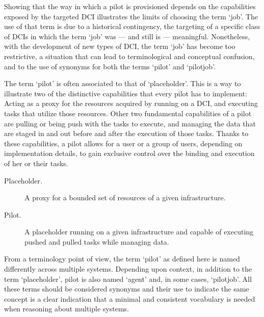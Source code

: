\documentclass{sig-alternate}
\begin{document}
Showing that the way in which a pilot is provisioned depends on the 
capabilities exposed by the targeted DCI illustrates the limits of choosing 
the term `job'. The use of that term is due to a historical contingency, the 
targeting of a specific class of DCIs in which the term `job' was --- and 
still is --- meaningful. Nonetheless, with the development of new types of 
DCI, the term `job' has become too restrictive, a situation that can lead to 
terminological and conceptual confusion, and to the use of synonyms for both 
the terms `pilot' and `pilotjob'.

The term `pilot' is often associated to that of `placeholder'. This is a way 
to illustrate two of the distinctive capabilities that every pilot has to 
implement: Acting as a proxy for the resources acquired by running on a DCI, 
and executing tasks that utilize those resources. Other two fundamental 
capabilities of a pilot are pulling or being push with the tasks to execute, 
and managing the data that are staged in and out before and after the 
execution of those tasks. Thanks to these capabilities, a pilot allows for a 
user or a group of users, depending on implementation details, to gain 
exclusive control over the binding and execution of her or their tasks.

\begin{description}
  \item[Placeholder.] A proxy for a bounded set of resources of a
    given infrastructure.  
  \item[Pilot.] A placeholder running on a given infrastructure and
    capable of executing pushed and pulled tasks while managing data. 

\end{description}

From a terminology point of view, the term `pilot' as defined here is
named differently across multiple \pilotjob systems. Depending upon
context, in addition to the term `placeholder', pilot is also named
`agent' and, in some cases, `pilotjob'. All these terms should be
considered synonyms and their use to indicate the same concept is a
clear indication that a minimal and consistent vocabulary is needed
when reasoning about multiple \pilotjob systems.
\end{document}
